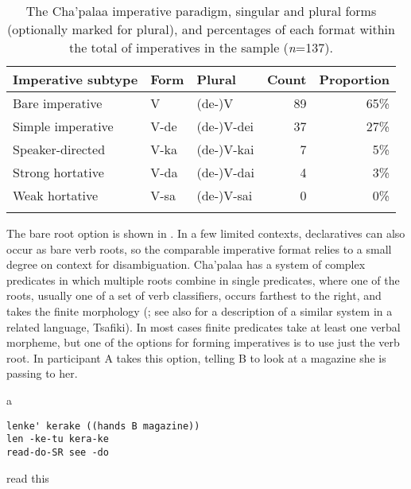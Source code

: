 \documentclass[output=paper]{langsci/langscibook}
\begin{document}
\begin{table}
\begin{tabularx}{\textwidth}{Xllrr}
\lsptoprule
Imperative subtype & Form & Plural & Count & Proportion \\
\midrule
Bare imperative & V & (de-)V & 89 & 65\%\\
Simple imperative & V-de & (de-)V-dei & 37 & 27\%\\
Speaker-directed & V-ka & (de-)V-kai & 7 & 5\%\\
Strong hortative & V-da & (de-)V-dai & 4 & 3\%\\
Weak hortative & V-sa & (de-)V-sai & 0 & 0\%\\
\lspbottomrule
\end{tabularx}
\caption{The Cha’palaa imperative paradigm, singular and plural forms (optionally marked for plural), and percentages of each format within the total of imperatives in the sample (\textit{n}=137).}
\label{tab:floyd:4}
\end{table}

The bare root option is shown in . In a few limited contexts, declaratives can also occur as bare verb roots, so the comparable imperative format relies to a small degree on context for disambiguation.  Cha'palaa has a system of complex predicates in which multiple roots combine in single predicates, where one of the roots, usually one of a set of verb classifiers, occurs farthest to the right, and takes the finite morphology (\citealt{Floyd2014a}; see also \citealt{Dickinson2000} for a description of a similar system in a related language, Tsafiki). In most cases finite predicates take at least one verbal morpheme, but one of the options for forming imperatives is to use just the verb root. In  participant A takes this option, telling B to look at a magazine she is passing to her.

\newpage
{}\vspace{-1mm}
%
\begin{mdframednoverticalspace}[style=firstfoc]
\begin{transbox}{1}{a}
\begin{verbatim}
lenke' kerake ((hands B magazine))
len -ke-tu kera-ke
read-do-SR see -do
\end{verbatim}
read this
\end{transbox}
\end{mdframednoverticalspace}
%
\begin{mdframednoverticalspace}[style=secondfoc]
\end{mdframednoverticalspace}
\end{document}
